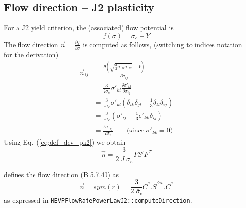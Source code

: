 \documentclass[]{scrreprt}
\begin{document}
\subsection{Flow direction -- J2 plasticity}
For a J2 yield criterion, the (associated) flow potential is
\begin{equation}
	f(\sigma) = \sigma_e - Y
\end{equation}
The flow direction $\vec{n} = \frac{\partial f}{\partial \sigma}$ is computed as follows, (switching to indices notation for the derivation)
\begin{align}
	\vec{n}_{ij} & = \frac{\partial \left( \sqrt{\frac{3}{2}\sigma'_{kl}\sigma'_{kl}} - Y \right)}{\partial \sigma_{ij}} \nonumber \\
	        & = \frac{3}{2\sigma_e}\sigma'_{kl}\frac{\partial \sigma'_{kl}}{\partial \sigma_{ij}} \nonumber \\
	        & = \frac{3}{2\sigma_e}\sigma'_{kl} \left(\delta_{ik}\delta_{jl} -\frac{1}{3}\delta_{kl}\delta_{ij} \right) \nonumber \\
	        & = \frac{3}{2\sigma_e} \left(\sigma'_{ij} -\frac{1}{3}\sigma'_{kk}\delta_{ij} \right) \nonumber \\
	        & = \frac{3\sigma'_{ij}}{2\sigma_e} \qquad \text{(since $\sigma'_{kk}=0$)}
\end{align}
Using Eq.~(\ref{eq:def_dev_pk2}) we obtain
\begin{equation}
	\vec{n} = \frac{3}{2\;J\;\sigma_e} FS'F^T
\end{equation}

\citet{Belytschko2014} defines the flow direction (B 5.7.40) as 
\begin{equation}
  \vec{n} = sym(\bar{r}) = \frac{3}{2\;\bar{\sigma}_e} \bar{C}^e.\bar{S}^{dev}.\bar{C}^e
\end{equation}
as expressed in \texttt{HEVPFlowRatePowerLawJ2::computeDirection}.
\end{document}
